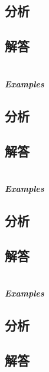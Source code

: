 \documentclass[UTF8,a4paper,12pt]{ctexbook}
\begin{document}
	\subsection{分析}
	
	\subsection{解答}
	
\section{}
	
	\subparagraph{Examples}
	
	\subsection{分析}
	
	\subsection{解答}
	
\section{}
	
	\subparagraph{Examples}
	
	\subsection{分析}
	
	\subsection{解答}
	
\section{}
	
	\subparagraph{Examples}
	
	\subsection{分析}
	
	\subsection{解答}
	
\end{document}
